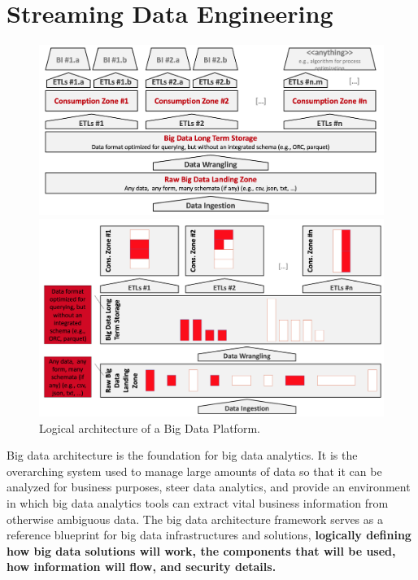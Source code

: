 \documentclass[10pt,a4paper]{article}
\begin{document}
\section{Streaming Data Engineering}
 
 \begin{figure}[ht!]
\centering
\begin{minipage}{.5\textwidth}
  \centering
  \includegraphics[width=.9\linewidth]{images/big-data-logical-arch}
\end{minipage}%
\begin{minipage}{.5\textwidth}
  \centering
  \includegraphics[width=.9\linewidth]{images/big-data-logical-arch2}
\end{minipage}
\caption{Logical architecture of a Big Data Platform.}
\end{figure} 

Big data architecture is the foundation for big data analytics. It is the overarching system used to manage large amounts of data so that it can be analyzed for business purposes, steer data analytics, and provide an environment in which big data analytics tools can extract vital business information from otherwise ambiguous data. The big data architecture framework serves as a reference blueprint for big data infrastructures and solutions, \textbf{logically defining how big data solutions will work, the components that will be used, how information will flow, and security details.}
\end{document}
